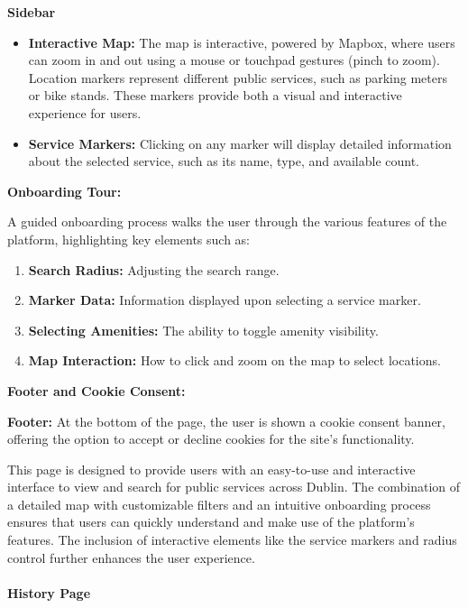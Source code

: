 \textbf{Sidebar}

\begin{itemize}
    \item{} \textbf{Interactive Map:} The map is interactive, powered by Mapbox, where users can zoom in and out using a mouse or touchpad gestures (pinch to zoom). Location markers represent different public services, such as parking meters or bike stands. These markers provide both a visual and interactive experience for users.
    \item{} \textbf{Service Markers:} Clicking on any marker will display detailed information about the selected service, such as its name, type, and available count.
\end{itemize}

\textbf{Onboarding Tour:}

A guided onboarding process walks the user through the various features of the platform, highlighting key elements such as:

\begin{enumerate}
    \item{} \textbf{Search Radius:} Adjusting the search range.
    \item{} \textbf{Marker Data:} Information displayed upon selecting a service marker.
    \item{} \textbf{Selecting Amenities:} The ability to toggle amenity visibility.
    \item{} \textbf{Map Interaction:} How  to click and zoom on the map to select locations.
\end{enumerate}

\textbf{Footer and Cookie Consent:}

\textbf{Footer:} At the bottom of the page, the user is shown a cookie consent banner, offering the option to accept or decline cookies for the site’s functionality.

This page is designed to provide users with an easy{-}to{-}use and interactive interface to view and search for public services across Dublin. The combination of a detailed map with customizable filters and an intuitive onboarding process ensures that users can quickly understand and make use of the platform’s features. The inclusion of interactive elements like the service markers and radius control further enhances the user experience.


\paragraph{History Page}\mbox{}

